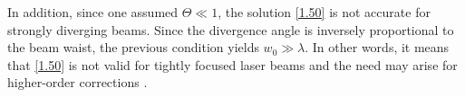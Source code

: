In addition, since one assumed $ \Theta \ll 1 $, the solution \ref{1.50} is not accurate for strongly diverging beams. Since the divergence angle is inversely proportional to the beam waist, the previous condition yields $ w_0 \gg \lambda $. In other words, it means that \ref{1.50} is not valid for tightly focused laser beams and the need may arise for higher-order corrections \cite{Thiele2016}. 